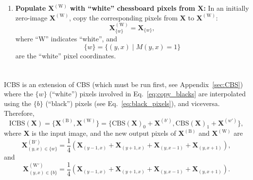 \begin{subappendices}
\begin{enumerate}
\item \textbf{Populate} $\mathbf{X}^{(\text{W})}$ \textbf{with
    ``white'' chessboard pixels from $\mathbf{X}$:} In an initially
  zero-image $\mathbf{X}^{(\text{W})}$, copy the corresponding pixels
  from $\mathbf{X}$ to $\mathbf{X}^{(\text{W})}$:
  \begin{equation}
    \mathbf{X}^{(\text{W})}_{\{w\}} = \mathbf{X}_{\{w\}},
    \label{eq:copy_whites}
  \end{equation}
  where ``W'' indicates ``white'', and
  \begin{equation}
    \{w\} = \{(y, x) \mid M(y, x)=1\}
    \label{eq:white_pixels}
  \end{equation}
  are the ``white'' pixel coordinates.
  
\end{enumerate}


\section{}
\label{sec:ICBS}

\acrshort{ICBS} is an extension of \gls{CBS} (which must be run first, see
Appendix~\ref{sec:CBS}) where the $\{w\}$ (``white'') pixels involved
in Eq.~\ref{eq:copy_blacks} are interpolated using the $\{b\}$
(``black'') pixels (see Eq.~\ref{eq:black_pixels}), and
viceversa. Therefore,
\begin{equation}
  \mathrm{ICBS}(\mathbf{X})=\{\mathbf{X}^{(\text{B})},\mathbf{X}^{(\text{W})}\}=\{\text{CBS}(\mathbf{X})_0 + \mathbf{X}^{(b')},\text{CBS}(\mathbf{X})_1 + \mathbf{X}^{(w')}\},
\end{equation}
where $\mathbf{X}$ is the input image, and the new output pixels of
$\mathbf{X}^{(\text{B})}$ and $\mathbf{X}^{(\text{W})}$ are
\begin{equation}
  \mathbf{X}^{(\text{B}')}_{(y,x)\in\{w\}} = \frac{1}{4}(\mathbf{X}_{(y-1,x)}+\mathbf{X}_{(y+1,x)}+\mathbf{X}_{(y,x-1)}+\mathbf{X}_{(y,x+1)}),
\end{equation}
and
\begin{equation}
  \mathbf{X}^{(\text{W}')}_{(y,x)\in\{b\}} = \frac{1}{4}(\mathbf{X}_{(y-1,x)}+\mathbf{X}_{(y+1,x)}+\mathbf{X}_{(y,x-1)}+\mathbf{X}_{(y,x+1)}).
\end{equation}


\section{}
\label{sec:SCBS}


\end{subappendices}
